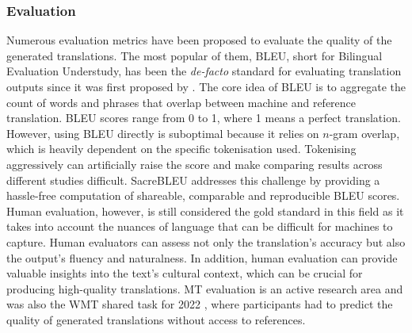 \documentclass[11pt]{article}
\begin{document}
\subsubsection*{Evaluation} \vspace{-2mm}
Numerous evaluation metrics have been proposed to evaluate the quality of the generated translations. The most popular of them, BLEU, short for Bilingual Evaluation Understudy, has been the \textit{de-facto} standard for evaluating translation outputs since it was first proposed by \cite{papineni2002bleu}. 
The core idea of BLEU is to aggregate the count of words and phrases that overlap between machine and reference translation. 
BLEU scores range from 0 to 1, where 1 means a perfect translation. However, using BLEU directly is suboptimal because it relies on $n$-gram overlap, which is heavily dependent on the specific tokenisation used. Tokenising aggressively can artificially raise the score and make comparing results across different studies difficult. SacreBLEU \citep{post-2018-call} addresses this challenge by providing a hassle-free computation of shareable, comparable and reproducible BLEU scores.
Human evaluation, however, is still considered the gold standard in this field as it takes into account the nuances of language that can be difficult for machines to capture. Human evaluators can assess not only the translation's accuracy but also the output's fluency and naturalness. In addition, human evaluation can provide valuable insights into the text's cultural context, which can be crucial for producing high-quality translations.
MT evaluation is an active research area and was also the WMT shared task for 2022 \citep{zerva-etal-2022-findings}, where participants had to predict the quality of generated translations without access to references.
\end{document}
